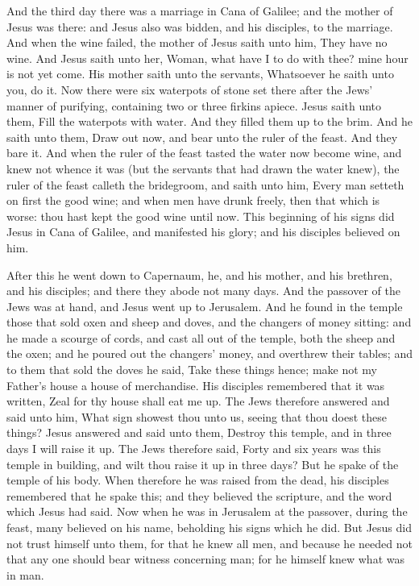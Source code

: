 And the third day there was a marriage in Cana of Galilee; and the mother of Jesus was there: and Jesus also was bidden, and his disciples, to the marriage. And when the wine failed, the mother of Jesus saith unto him, They have no wine. And Jesus saith unto her, Woman, what have I to do with thee? mine hour is not yet come. His mother saith unto the servants, Whatsoever he saith unto you, do it. Now there were six waterpots of stone set there after the Jews’ manner of purifying, containing two or three firkins apiece. Jesus saith unto them, Fill the waterpots with water. And they filled them up to the brim. And he saith unto them, Draw out now, and bear unto the ruler of the feast. And they bare it. And when the ruler of the feast tasted the water now become wine, and knew not whence it was (but the servants that had drawn the water knew), the ruler of the feast calleth the bridegroom, and saith unto him, Every man setteth on first the good wine; and when men have drunk freely, then that which is worse: thou hast kept the good wine until now. This beginning of his signs did Jesus in Cana of Galilee, and manifested his glory; and his disciples believed on him.  

After this he went down to Capernaum, he, and his mother, and his brethren, and his disciples; and there they abode not many days.  And the passover of the Jews was at hand, and Jesus went up to Jerusalem. And he found in the temple those that sold oxen and sheep and doves, and the changers of money sitting: and he made a scourge of cords, and cast all out of the temple, both the sheep and the oxen; and he poured out the changers’ money, and overthrew their tables; and to them that sold the doves he said, Take these things hence; make not my Father’s house a house of merchandise. His disciples remembered that it was written, Zeal for thy house shall eat me up. The Jews therefore answered and said unto him, What sign showest thou unto us, seeing that thou doest these things? Jesus answered and said unto them, Destroy this temple, and in three days I will raise it up. The Jews therefore said, Forty and six years was this temple in building, and wilt thou raise it up in three days? But he spake of the temple of his body. When therefore he was raised from the dead, his disciples remembered that he spake this; and they believed the scripture, and the word which Jesus had said.  Now when he was in Jerusalem at the passover, during the feast, many believed on his name, beholding his signs which he did. But Jesus did not trust himself unto them, for that he knew all men, and because he needed not that any one should bear witness concerning man; for he himself knew what was in man. 

